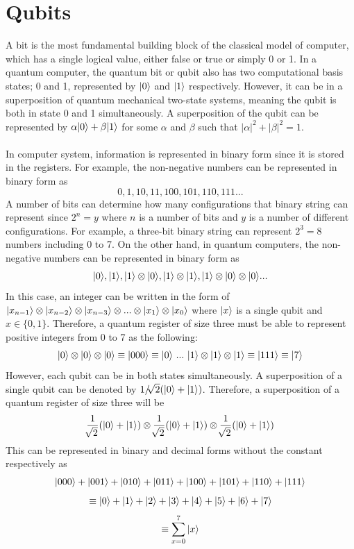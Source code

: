 \documentclass[12pt]{third-rep}
\begin{document}
\section{Qubits}
A bit is the most fundamental building block of the classical model of computer, which has a single logical value, either false or true or simply 0 or 1. In a quantum computer, the quantum bit or qubit also has two computational basis states; 0 and 1, represented by ${\left\vert{0}\right\rangle}$ and ${\left\vert{1}\right\rangle}$ respectively. However, it can be in a superposition of quantum mechanical two-state systems, meaning the qubit is both in state 0 and 1 simultaneously. A superposition of the qubit can be represented by $\alpha{\left\vert{0}\right\rangle}+\beta{\left\vert{1}\right\rangle}$ for some $\alpha$ and $\beta$ such that $|\alpha|^2+|\beta|^2=1$. \\\\
In computer system, information is represented in binary form since it is stored in the registers. For example, the non-negative numbers can be represented in binary form as
$$0,1,10,11,100,101,110,111...$$
A number of bits can determine how many configurations that binary string can represent since $2^n=y$ where $n$ is a number of bits and $y$ is a number of different configurations. For example, a three-bit binary string can represent $2^3=8$ numbers including 0 to 7. On the other hand, in quantum computers, the non-negative numbers can be represented in binary form as
$${\left\vert{0}\right\rangle},{\left\vert{1}\right\rangle},{\left\vert{1}\right\rangle}\otimes{\left\vert{0}\right\rangle},{\left\vert{1}\right\rangle}\otimes{\left\vert{1}\right\rangle},{\left\vert{1}\right\rangle}\otimes{\left\vert{0}\right\rangle}\otimes{\left\vert{0}\right\rangle}...$$
In this case, an integer can be written in the form of ${\left\vert{x_{n-1}}\right\rangle}\otimes{\left\vert{x_{n-2}}\right\rangle}\otimes{\left\vert{x_{n-3}}\right\rangle}\otimes...\otimes{\left\vert{x_1}\right\rangle}\otimes{\left\vert{x_0}\right\rangle}$ where ${\left\vert{x}\right\rangle}$ is a single qubit and $x\in\{0,1\}$. Therefore, a quantum register of size three must be able to represent positive integers from 0 to 7 as the following:
$$\ket{0}\otimes\ket{0}\otimes\ket{0}\equiv\ket{000}\equiv\ket{0} \ ...\ \ket{1}\otimes\ket{1}\otimes\ket{1}\equiv\ket{111}\equiv\ket{7}$$
However, each qubit can be in both states simultaneously. A superposition of a single qubit can be denoted by $1/\sqrt[]{2}({\left\vert{0}\right\rangle}+{\left\vert{1}\right\rangle})$. Therefore, a superposition of a quantum register of size three will be
$$\frac{1}{\sqrt[]{2}}({\left\vert{0}\right\rangle}+{\left\vert{1}\right\rangle})\otimes\frac{1}{\sqrt[]{2}}({\left\vert{0}\right\rangle}+{\left\vert{1}\right\rangle})\otimes\frac{1}{\sqrt[]{2}}({\left\vert{0}\right\rangle}+{\left\vert{1}\right\rangle})$$
This can be represented in binary and decimal forms without the constant respectively as
$${\left\vert{000}\right\rangle}+{\left\vert{001}\right\rangle}+{\left\vert{010}\right\rangle}+{\left\vert{011}\right\rangle}+{\left\vert{100}\right\rangle}+{\left\vert{101}\right\rangle}+{\left\vert{110}\right\rangle}+{\left\vert{111}\right\rangle}$$
$$\equiv{\left\vert{0}\right\rangle}+{\left\vert{1}\right\rangle}+{\left\vert{2}\right\rangle}+{\left\vert{3}\right\rangle}+{\left\vert{4}\right\rangle}+{\left\vert{5}\right\rangle}+{\left\vert{6}\right\rangle}+{\left\vert{7}\right\rangle}$$
$$\equiv\sum_{x=0}^{7}{\left\vert{x}\right\rangle}$$
\end{document}
